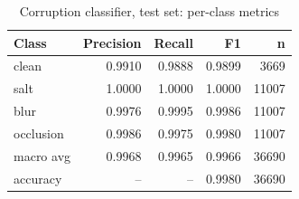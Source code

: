 \begin{table}[t]
\centering
\caption{Corruption classifier, test set: per-class metrics}
\label{tab:t2_clf_test}
\begin{tabular}{lrrrr}
\toprule
Class & Precision & Recall & F1 & n \\
\midrule
clean & 0.9910 & 0.9888 & 0.9899 & 3669 \\
salt & 1.0000 & 1.0000 & 1.0000 & 11007 \\
blur & 0.9976 & 0.9995 & 0.9986 & 11007 \\
occlusion & 0.9986 & 0.9975 & 0.9980 & 11007 \\
macro avg & 0.9968 & 0.9965 & 0.9966 & 36690 \\
accuracy & -- & -- & 0.9980 & 36690 \\
\bottomrule
\end{tabular}
\end{table}
